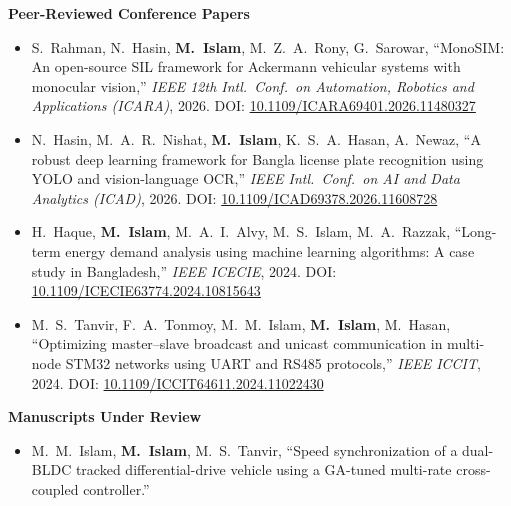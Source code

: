 \documentclass[10pt]{article}
\newcommand{\me}{\textbf{M.\ Islam}}
\begin{document}
\textbf{Peer-Reviewed Conference Papers}
\begin{itemize}
    \item S.\ Rahman, N.\ Hasin, \me, M.\ Z.\ A.\ Rony, G.\ Sarowar, ``MonoSIM: An open-source SIL
    framework for Ackermann vehicular systems with monocular vision,'' \textit{IEEE 12th Intl.\
    Conf.\ on Automation, Robotics and Applications (ICARA)}, 2026.
    DOI: \href{https://doi.org/10.1109/ICARA69401.2026.11480327}{10.1109/ICARA69401.2026.11480327}
    \item N.\ Hasin, M.\ A.\ R.\ Nishat, \me, K.\ S.\ A.\ Hasan, A.\ Newaz, ``A robust deep learning
    framework for Bangla license plate recognition using YOLO and vision-language OCR,''
    \textit{IEEE Intl.\ Conf.\ on AI and Data Analytics (ICAD)}, 2026.
    DOI: \href{https://doi.org/10.1109/ICAD69378.2026.11608728}{10.1109/ICAD69378.2026.11608728}
    \item H.\ Haque, \me, M.\ A.\ I.\ Alvy, M.\ S.\ Islam, M.\ A.\ Razzak, ``Long-term energy demand
    analysis using machine learning algorithms: A case study in Bangladesh,'' \textit{IEEE ICECIE},
    2024.
    DOI: \href{https://doi.org/10.1109/ICECIE63774.2024.10815643}{10.1109/ICECIE63774.2024.10815643}
    \item M.\ S.\ Tanvir, F.\ A.\ Tonmoy, M.\ M.\ Islam, \me, M.\ Hasan, ``Optimizing master--slave
    broadcast and unicast communication in multi-node STM32 networks using UART and RS485
    protocols,'' \textit{IEEE ICCIT}, 2024.
    DOI: \href{https://doi.org/10.1109/ICCIT64611.2024.11022430}{10.1109/ICCIT64611.2024.11022430}
   
\end{itemize}
\newpage
\textbf{Manuscripts Under Review}
\begin{itemize}
    
    \item M.\ M.\ Islam, \me, M.\ S.\ Tanvir, ``Speed synchronization of a dual-BLDC tracked
    differential-drive vehicle using a GA-tuned multi-rate cross-coupled controller.''
\end{itemize}


\end{document}
